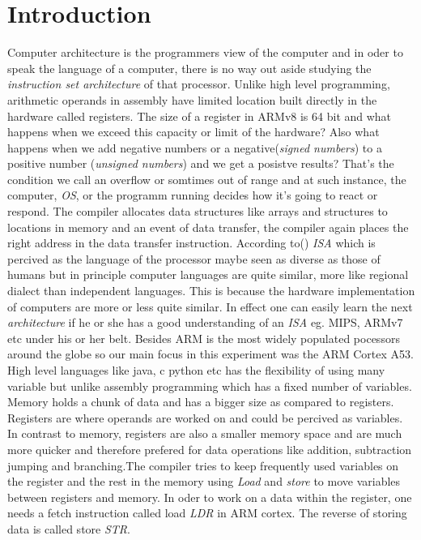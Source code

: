 \section*{Introduction}
Computer architecture is the programmers view of the computer and in oder to speak the language of a computer,
there is no way out aside studying the \textit{instruction set architecture} of that processor.
Unlike high level programming, arithmetic operands in assembly have limited location built directly
in the hardware called registers. The size of a register in ARMv8 is 64 bit and what happens when we exceed this 
capacity or 
limit of the hardware? Also what happens when we add negative numbers or a negative(\textit{signed numbers}) to a positive number
(\textit{unsigned numbers})
and we get a posistve results? That's the condition we call an overflow or somtimes out of range and at such instance, the computer, 
\textit{OS}, or the programm running decides how it's going to react or respond. The compiler allocates data
structures like arrays and structures to locations in memory and an event of data transfer, the compiler again 
places the right address in the data transfer instruction.
According to(\cite{patterson2016}) 
\textit{ISA} which is  percived as the language of the processor maybe seen as diverse as those of humans 
but in principle computer languages are quite similar, more like regional dialect than independent languages. This 
is because the hardware implementation of computers are more or less quite similar. In effect one can easily learn 
the next \textit{architecture} if he or she has a good understanding of an \textit{ISA} eg. MIPS, ARMv7 etc 
under his or her belt. Besides ARM is the most widely populated pocessors around the globe so  our 
main focus in this experiment was the  ARM Cortex A53.
High level languages like java, c python etc has the flexibility of using many variable but unlike assembly 
programming which has a fixed number of variables. Memory holds a chunk of data and has a bigger size as compared 
to registers. Registers are where operands are worked on and could be percived as variables. In contrast to memory, 
registers are also a smaller memory space and are much more quicker and therefore prefered for data operations like
addition, subtraction jumping and branching.The compiler tries to keep frequently used variables on the register 
and the rest in the memory using \textit{Load} and \textit{store} to move variables between registers and memory.
In oder to work on a data within the register, one needs a fetch 
instruction called load \textit{LDR} in ARM cortex. The reverse of storing data is called store \textit{STR}.


